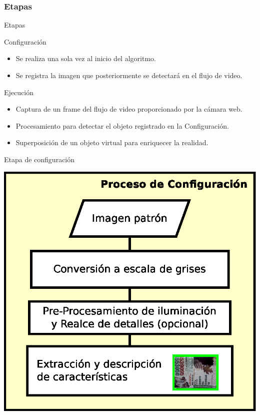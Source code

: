 \subsubsection*{Etapas}
\begin{frame}{Etapas}
  \begin{block}{Configuración}
   \begin{itemize}
    \item Se realiza una sola vez al inicio del algoritmo.
    \item Se registra la imagen que posteriormente se detectará en el flujo de video.
   \end{itemize}
  \end{block}
  \begin{block}{Ejecución}
   \begin{itemize}
    \item Captura de un frame del flujo de video proporcionado por la cámara web.
    \item Procesamiento para detectar el objeto registrado en la Configuración.
    \item Superposición de un objeto virtual para enriquecer la realidad.
   \end{itemize}
  \end{block}
\end{frame}
%
\begin{frame}{Etapa de configuración}
	\begin{center}
  	  \includegraphics[scale=0.5]{../../figs/proceso_completo_entrenamiento_presentacion}
	\end{center}
\end{frame}
